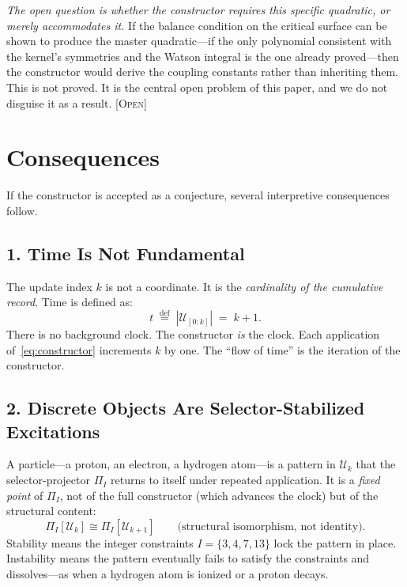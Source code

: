 \documentclass[11pt,a4paper]{article}
\newcommand{\UU}{\mathcal{U}}
\newcommand{\PP}{\Pi}
\newcommand{\etag}[1]{{\normalfont\textsc{\footnotesize [#1]}}}
\theoremstyle{compact}
\begin{document}
\emph{The open question is whether the constructor requires this specific quadratic, or merely accommodates it.} If the balance condition on the critical surface can be shown to produce the master quadratic---if the only polynomial consistent with the kernel's symmetries and the Watson integral is the one already proved---then the constructor would derive the coupling constants rather than inheriting them. This is not proved. It is the central open problem of this paper, and we do not disguise it as a result. \etag{Open}


\section{Consequences}
\label{sec:consequences}

If the constructor is accepted as a conjecture, several interpretive consequences follow.

\subsection*{1. Time Is Not Fundamental}

The update index $k$ is not a coordinate. It is the \emph{cardinality of the cumulative record}. Time is defined as:
\[
t \;\stackrel{\text{def}}{=}\; |\UU_{[0:k]}| \;=\; k + 1.
\]
There is no background clock. The constructor \emph{is} the clock. Each application of~\eqref{eq:constructor} increments $k$ by one. The ``flow of time'' is the iteration of the constructor.

\subsection*{2. Discrete Objects Are Selector-Stabilized Excitations}

A particle---a proton, an electron, a hydrogen atom---is a pattern in $\UU_k$ that the selector-projector $\PP_I$ returns to itself under repeated application. It is a \emph{fixed point} of $\PP_I$, not of the full constructor (which advances the clock) but of the structural content:
\[
\PP_I[\UU_k] \cong \PP_I[\UU_{k+1}] \qquad \text{(structural isomorphism, not identity)}.
\]
Stability means the integer constraints $I = \{3,4,7,13\}$ lock the pattern in place. Instability means the pattern eventually fails to satisfy the constraints and dissolves---as when a hydrogen atom is ionized or a proton decays.
\end{document}
